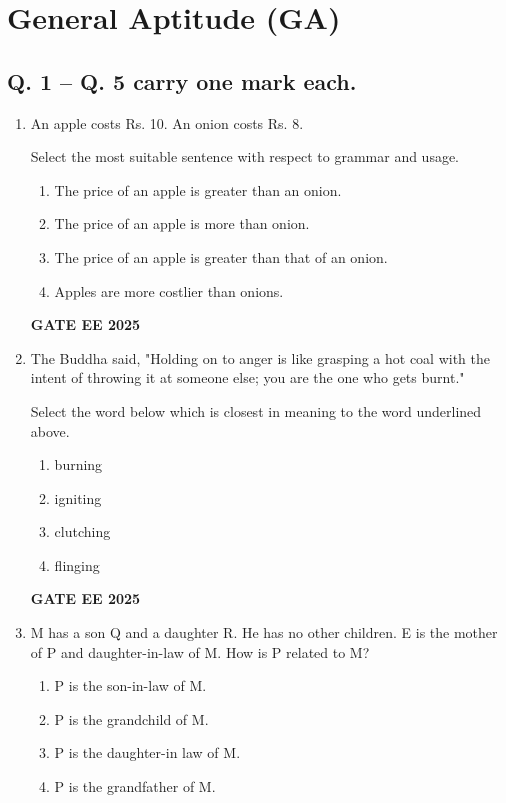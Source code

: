 \documentclass[journal]{IEEEtran}
\begin{document}
\section*{General Aptitude (GA)}

\subsection*{Q. 1 – Q. 5 carry one mark each.}

\begin{enumerate}[label=Q.\arabic*]
    \item An apple costs Rs. 10. An onion costs Rs. 8. 
    
    Select the most suitable sentence with respect to grammar and usage.
    
    \begin{enumerate}[label=(\Alph*)]
        \item The price of an apple is greater than an onion.
        \item The price of an apple is more than onion.
        \item The price of an apple is greater than that of an onion.
        \item Apples are more costlier than onions.
    \end{enumerate}
    
    \textbf{GATE EE 2025}
    
    \item The Buddha said, "Holding on to anger is like grasping a hot coal with the intent of throwing it at someone else; you are the one who gets burnt."
    
    Select the word below which is closest in meaning to the word underlined above.
    
    \begin{enumerate}[label=(\Alph*)]
        \item burning 
        \item igniting 
        \item clutching 
        \item flinging
    \end{enumerate}
    
    \textbf{GATE EE 2025}
    
    \item M has a son Q and a daughter R. He has no other children. E is the mother of P and daughter-in-law of M. How is P related to M?
    
    \begin{enumerate}[label=(\Alph*)]
        \item P is the son-in-law of M. 
        \item P is the grandchild of M.
        \item P is the daughter-in law of M. 
        \item P is the grandfather of M.
    \end{enumerate}
    

\end{enumerate}
\end{document}
